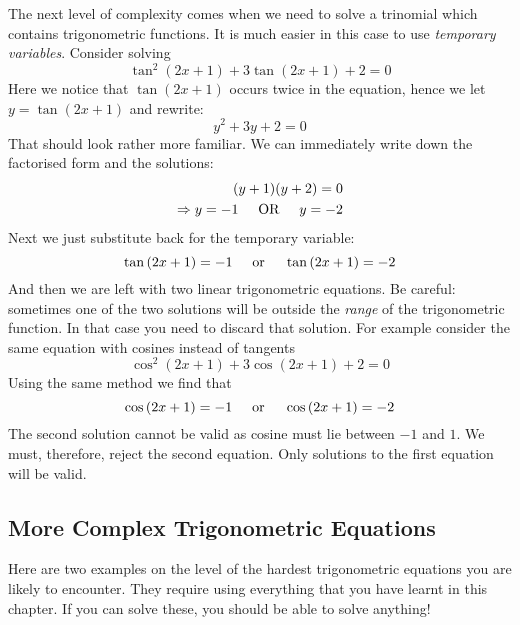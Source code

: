 The next level of complexity comes when we need to solve a trinomial which contains trigonometric functions. It is much easier in this case to use \emph{temporary variables}.
Consider solving
\[ \tan^2{(2x + 1)} + 3\tan{(2x + 1)} + 2 = 0 \]
Here we notice that $\tan(2x + 1)$ occurs twice in the equation, hence we let $y = \tan(2x + 1)$ and rewrite:
\[ y^2 + 3y + 2 = 0 \]
That should look rather more familiar. We can immediately write down the factorised form and the solutions:
\begin{eqnarray*}
(y + 1)(y + 2) = 0 \\
\Rightarrow y = -1 \hspace{0.5cm} \mbox{OR} \hspace{0.5cm} y = -2 \\
\end{eqnarray*}
Next we just substitute back for the temporary variable:
\[ \tan{(2x + 1)} = -1 \hspace{0.5cm} \mbox{or} \hspace{0.5cm} \tan{(2x + 1)} = -2 \]
And then we are left with two linear trigonometric equations. Be careful: sometimes one of the two solutions will be outside the \emph{range} of the trigonometric function. In that case you need to discard that solution. For example consider the same equation with cosines instead of tangents
\[ \cos^2{(2x + 1)} + 3\cos{(2x + 1)} + 2 = 0 \]
Using the same method we find that
\[ \cos{(2x + 1)} = -1 \hspace{0.5cm} \mbox{or} \hspace{0.5cm} \cos{(2x + 1)} = -2 \]
The second solution cannot be valid as cosine must lie between $-1$ and $1$. We must, therefore, reject the second equation. Only solutions to the first equation will be valid. 

\subsection{More Complex Trigonometric Equations}
Here are two examples on the level of the hardest trigonometric equations you are likely to encounter. They require using everything that you have learnt in this chapter. If you can solve these, you should be able to solve anything! 

